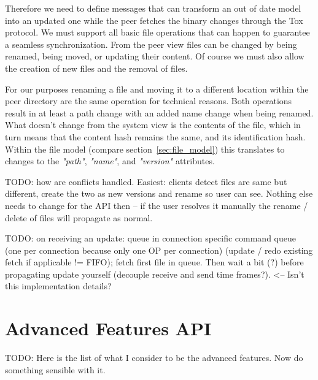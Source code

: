 Therefore we need to define messages that can transform an out of date model into an updated one while the peer fetches the binary changes through the Tox protocol.
We must support all basic file operations that can happen to guarantee a seamless synchronization.
From the peer view files can be changed by being renamed, being moved, or updating their content.
Of course we must also allow the creation of new files and the removal of files.

For our purposes renaming a file and moving it to a different location within the peer directory are the same operation for technical reasons.
Both operations result in at least a path change with an added name change when being renamed.
What doesn't change from the system view is the contents of the file, which in turn means that the content hash remains the same, and its identification hash.
Within the file model (compare section~\ref{sec:file_model}) this translates to changes to the \textit{"path"}, \textit{"name"}, and \textit{"version"} attributes.

TODO: how are conflicts handled.
Easiest: clients detect files are same but different, create the two as new versions and rename so user can see.
Nothing else needs to change for the API then – if the user resolves it manually the rename / delete of files will propagate as normal.

TODO: on receiving an update: queue in connection specific command queue (one per connection because only one OP per connection) (update / redo existing fetch if applicable != FIFO); fetch first file in queue.
Then wait a bit (?) before propagating update yourself (decouple receive and send time frames?). <-- Isn't this implementation details?

\section{Advanced Features API}

TODO: Here is the list of what I consider to be the advanced features.
Now do something sensible with it.

